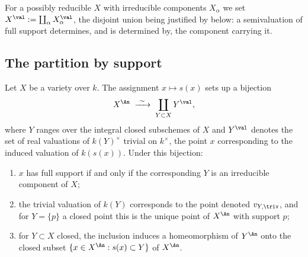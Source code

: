 For a possibly reducible $X$ with irreducible components $X_\alpha$ we
set $X^{\val}:=\coprod_\alpha X_\alpha^{\val}$, the disjoint union being
justified by  below: a semivaluation of
full support determines, and is determined by, the component carrying it.

\subsection{The partition by support}
\label{sec:ch32-partition}

\begin{proposition}
\label{prop:ch32-support-partition}
Let $X$ be a variety over $k$.  The assignment $x\mapsto s(x)$ sets up
a bijection
\[
 X^{\An}\;\xrightarrow{\ \sim\ }\;\coprod_{Y\subset X}Y^{\val},
\]
where $Y$ ranges over the integral closed subschemes of $X$ and
$Y^{\val}$ denotes the set of real valuations of $k(Y)^\times$ trivial on
$k^\times$, the point $x$ corresponding to the induced valuation of
$k(s(x))$.  Under this bijection:
\begin{enumerate}
\item\label{itm:ch32-sp:full} $x$ has full support if and only if the
corresponding $Y$ is an irreducible component of $X$;
\item\label{itm:ch32-sp:triv} the trivial valuation of $k(Y)$ corresponds
to the point denoted $v_{Y,\triv}$, and for $Y=\{p\}$ a closed point this
is the unique point of $X^{\An}$ with support $p$;
\item\label{itm:ch32-sp:closed} for $Y\subset X$ closed, the inclusion
induces a homeomorphism of $Y^{\An}$ onto the closed subset
$\{x\in X^{\An}:s(x)\subset Y\}$ of $X^{\An}$.
\end{enumerate}
\end{proposition}

